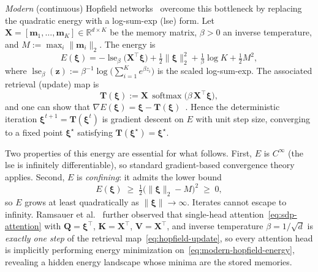 \textit{Modern} (continuous) Hopfield networks~\cite{ramsauerHopfieldNetworksAll2021} overcome this bottleneck by replacing the quadratic energy with a log-sum-exp (lse) form. Let $\mathbf{X}=[\mathbf{m}_1,\dots,\mathbf{m}_K]\in\mathbb{R}^{d\times K}$ be the memory matrix, $\beta>0$ an inverse temperature, and $M:=\max_i\|\mathbf{m}_i\|_2$. The energy is
\begin{equation}\label{eq:modern-hopfield-energy}
    E(\boldsymbol{\xi})
    = -\operatorname{lse}_\beta\!\bigl(\mathbf{X}^{\top}\boldsymbol{\xi}\bigr)
      + \tfrac{1}{2}\|\boldsymbol{\xi}\|_2^2
      + \tfrac{1}{\beta}\log K
      + \tfrac{1}{2}M^2,
\end{equation}
where $\operatorname{lse}_\beta(\mathbf{z}):=\beta^{-1}\log\bigl(\sum_{i=1}^{K}e^{\beta z_i}\bigr)$ is the scaled log-sum-exp. The associated retrieval (update) map is
\begin{equation}\label{eq:hopfield-update}
    \mathbf{T}(\boldsymbol{\xi})
    := \mathbf{X}\,\operatorname{softmax}\!\bigl(\beta\,\mathbf{X}^{\top}\boldsymbol{\xi}\bigr),
\end{equation}
and one can show that $\nabla E(\boldsymbol{\xi})=\boldsymbol{\xi}-\mathbf{T}(\boldsymbol{\xi})$~\cite{ramsauerHopfieldNetworksAll2021}. Hence the deterministic iteration $\boldsymbol{\xi}^{t+1}=\mathbf{T}(\boldsymbol{\xi}^t)$ is gradient descent on $E$ with unit step size, converging to a fixed point $\boldsymbol{\xi}^{\star}$ satisfying $\mathbf{T}(\boldsymbol{\xi}^{\star})=\boldsymbol{\xi}^{\star}$.

Two properties of this energy are essential for what follows. First, $E$ is $C^{\infty}$ (the lse is infinitely differentiable), so standard gradient-based convergence theory applies. Second, $E$ is \emph{confining}: it admits the lower bound~\cite{ramsauerHopfieldNetworksAll2021}
\begin{equation}\label{eq:energy-lower-bound}
    E(\boldsymbol{\xi}) \;\ge\; \tfrac{1}{2}\bigl(\|\boldsymbol{\xi}\|_2 - M\bigr)^2 \;\ge\; 0,
\end{equation}
so $E$ grows at least quadratically as $\|\boldsymbol{\xi}\|\to\infty$. Iterates cannot escape to infinity. Ramsauer et al.~\cite{ramsauerHopfieldNetworksAll2021} further observed that single-head attention~\eqref{eq:sdp-attention} with $\mathbf{Q}=\boldsymbol{\xi}^{\top}$, $\mathbf{K}=\mathbf{X}^{\top}$, $\mathbf{V}=\mathbf{X}^{\top}$, and inverse temperature $\beta=1/\sqrt{d}$ is \emph{exactly one step} of the retrieval map~\eqref{eq:hopfield-update}, so every attention head is implicitly performing energy minimization on~\eqref{eq:modern-hopfield-energy}, revealing a hidden energy landscape whose minima are the stored memories.

